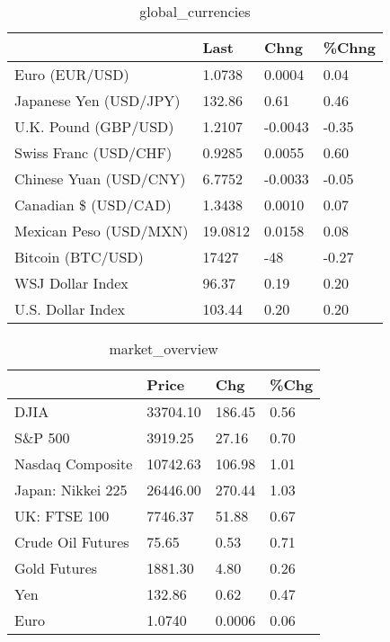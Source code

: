 \documentclass{article}%
\begin{document}
%


\begin{table}[htbp]%
\caption{global\_currencies}%
\centering%
\begin{adjustbox}{width=1\textwidth}%
\begin{tabular}{llll}
\toprule
                       &    Last &    Chng & \%Chng \\
\midrule
        Euro (EUR/USD) &  1.0738 &  0.0004 &  0.04 \\
Japanese Yen (USD/JPY) &  132.86 &    0.61 &  0.46 \\
  U.K. Pound (GBP/USD) &  1.2107 & -0.0043 & -0.35 \\
 Swiss Franc (USD/CHF) &  0.9285 &  0.0055 &  0.60 \\
Chinese Yuan (USD/CNY) &  6.7752 & -0.0033 & -0.05 \\
  Canadian \$ (USD/CAD) &  1.3438 &  0.0010 &  0.07 \\
Mexican Peso (USD/MXN) & 19.0812 &  0.0158 &  0.08 \\
     Bitcoin (BTC/USD) &   17427 &     -48 & -0.27 \\
      WSJ Dollar Index &   96.37 &    0.19 &  0.20 \\
     U.S. Dollar Index &  103.44 &    0.20 &  0.20 \\
\bottomrule
\end{tabular}
%
\end{adjustbox}%
\end{table}

%


\begin{table}[htbp]%
\caption{market\_overview}%
\centering%
\begin{adjustbox}{width=1\textwidth}%
\begin{tabular}{llll}
\toprule
                  &    Price &    Chg & \%Chg \\
\midrule
             DJIA & 33704.10 & 186.45 & 0.56 \\
          S\&P 500 &  3919.25 &  27.16 & 0.70 \\
 Nasdaq Composite & 10742.63 & 106.98 & 1.01 \\
Japan: Nikkei 225 & 26446.00 & 270.44 & 1.03 \\
     UK: FTSE 100 &  7746.37 &  51.88 & 0.67 \\
Crude Oil Futures &    75.65 &   0.53 & 0.71 \\
     Gold Futures &  1881.30 &   4.80 & 0.26 \\
              Yen &   132.86 &   0.62 & 0.47 \\
             Euro &   1.0740 & 0.0006 & 0.06 \\
\bottomrule
\end{tabular}
%
\end{adjustbox}%
\end{table}

%
\end{document}
